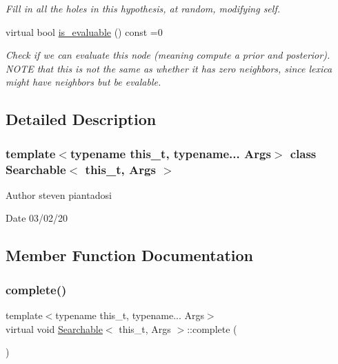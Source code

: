 \begin{DoxyCompactItemize}
\begin{DoxyCompactList}\small\item\em Fill in all the holes in this hypothesis, at random, modifying self. \end{DoxyCompactList}\item 
virtual bool \hyperlink{class_searchable_a2f2e0290252b5f43c98bc345844070ae}{is\+\_\+evaluable} () const =0
\begin{DoxyCompactList}\small\item\em Check if we can evaluate this node (meaning compute a prior and posterior). N\+O\+TE that this is not the same as whether it has zero neighbors, since lexica might have neighbors but be evalable. \end{DoxyCompactList}\end{DoxyCompactItemize}


\subsection{Detailed Description}
\subsubsection*{template$<$typename this\+\_\+t, typename... Args$>$\newline
class Searchable$<$ this\+\_\+t, Args $>$}

\begin{DoxyAuthor}{Author}
steven piantadosi 
\end{DoxyAuthor}
\begin{DoxyDate}{Date}
03/02/20 
\end{DoxyDate}


\subsection{Member Function Documentation}
\mbox{\label{class_searchable_a29ab2eb0471e2e9d96d39f0349f21571}} 
\subsubsection{\texorpdfstring{complete()}{complete()}}
{\footnotesize\ttfamily template$<$typename this\+\_\+t, typename... Args$>$ \\
virtual void \hyperlink{class_searchable}{Searchable}$<$ this\+\_\+t, Args $>$\+::complete (\begin{DoxyParamCaption}{ }\end{DoxyParamCaption})\hspace{0.3cm}{\ttfamily [pure virtual]}}



